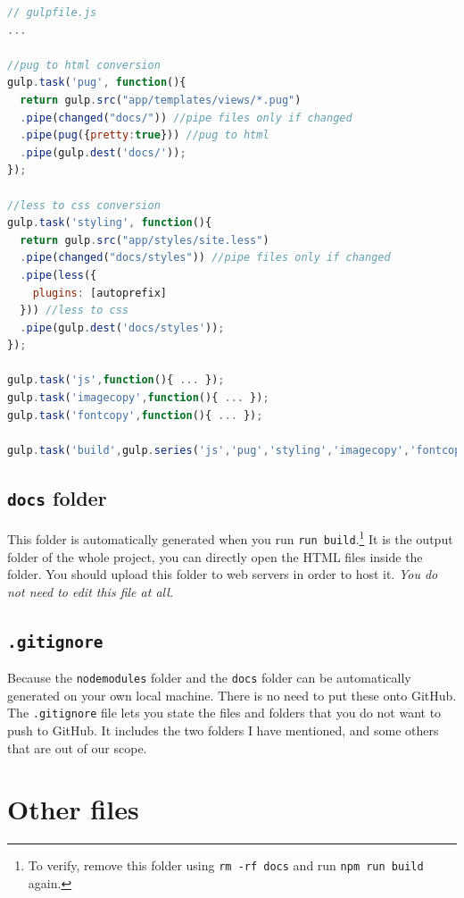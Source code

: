 \begin{lstlisting}[language=JavaScript]
// gulpfile.js
...

//pug to html conversion
gulp.task('pug', function(){
  return gulp.src("app/templates/views/*.pug")
  .pipe(changed("docs/")) //pipe files only if changed 
  .pipe(pug({pretty:true})) //pug to html
  .pipe(gulp.dest('docs/'));
});

//less to css conversion
gulp.task('styling', function(){
  return gulp.src("app/styles/site.less")
  .pipe(changed("docs/styles")) //pipe files only if changed 
  .pipe(less({
    plugins: [autoprefix]
  })) //less to css
  .pipe(gulp.dest('docs/styles'));
});

gulp.task('js',function(){ ... });
gulp.task('imagecopy',function(){ ... });
gulp.task('fontcopy',function(){ ... });

gulp.task('build',gulp.series('js','pug','styling','imagecopy','fontcopy'));

\end{lstlisting}

\subsection{\texttt{docs} folder}

This folder is automatically generated when you run \texttt{run build}.\footnote{To verify, remove this folder using \texttt{rm -rf docs} and run \texttt{npm run build} again.} It is the output folder of the whole project, you can directly open the HTML files inside the folder. You should upload this folder to web servers in order to host it.
\textit{You do not need to edit this file at all.}

\subsection{\texttt{.gitignore}}
\label{sec:gitignore}

Because the \texttt{node\textunderscore modules} folder and the \texttt{docs} folder can be automatically generated on your own local machine. There is no need to put these onto GitHub. The \texttt{.gitignore} file lets you state the files and folders that you do not want to push to GitHub. It includes the two folders I have mentioned, and some others that are out of our scope.

\section{Other files}

